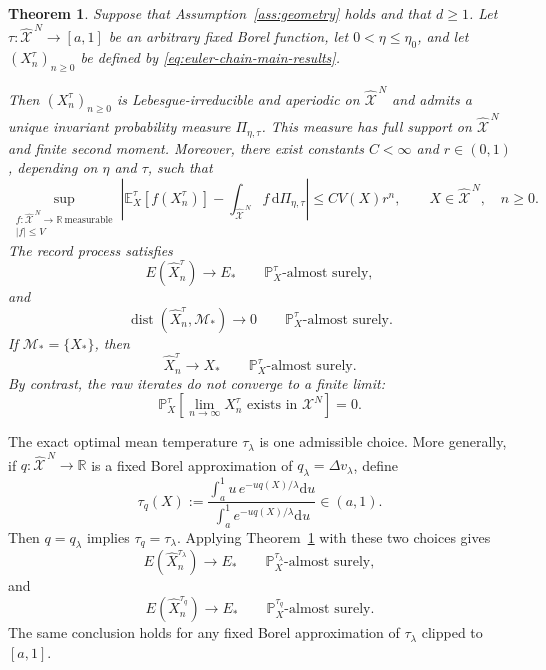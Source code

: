 \documentclass[11pt]{article}
\def\Mc{{\mathcal M}}
\def\Xc{{\mathcal X}}
\def\hX{\widehat{\Xc}^{\,N}}
\newcommand{\dd}{\mathrm{d}}
\newcommand{\dist}{\operatorname{dist}}
\newcommand{\Record}{\widehat X}
\newtheorem{theorem}{Theorem}[section]
\theoremstyle{definition}
\theoremstyle{remark}
\numberwithin{equation}{section}
\begin{document}
\begin{theorem}\label{thm:numerical-convergence}
Suppose that Assumption~\ref{ass:geometry} holds and that $d\ge1$.  Let
$\tau:\hX\to[a,1]$ be an arbitrary fixed Borel function, let $0<\eta\le\eta_0$, and let
$(X_n^\tau)_{n\ge0}$ be defined by \eqref{eq:euler-chain-main-results}.

Then $(X_n^\tau)_{n\ge0}$ is Lebesgue-irreducible and aperiodic on $\hX$ and admits a unique
invariant probability measure $\Pi_{\eta,\tau}$.  This measure has full support on $\hX$ and finite
second moment.  Moreover, there exist constants $C<\infty$ and $r\in(0,1)$, depending on $\eta$ and $\tau$, such that
\begin{equation}\label{eq:V-geometric}
 \sup_{\substack{
 f:\hX\to\mathbb R\ \mathrm{measurable}\\
 |f|\le V
 }}
 \left|
 \mathbb E_X^\tau[f(X_n^\tau)]
 -\int_{\hX}f\,\dd\Pi_{\eta,\tau}
 \right|
 \le C V(X)r^n,
 \qquad X\in\hX,\quad n\ge0.
\end{equation}
The record process satisfies
\begin{equation}\label{eq:record-energy-convergence}
 E(\Record_n^\tau)\longrightarrow E_*
 \qquad \mathbb P_X^\tau\text{-almost surely},
\end{equation}
and
\begin{equation}\label{eq:record-distance-convergence}
 \dist(\Record_n^\tau,\Mc_*)\longrightarrow0
 \qquad \mathbb P_X^\tau\text{-almost surely}.
\end{equation}
If $\Mc_*=\{X_*\}$, then
\[
 \Record_n^\tau\longrightarrow X_*
 \qquad \mathbb P_X^\tau\text{-almost surely}.
\]
By contrast, the raw iterates do not converge to a finite limit:
\begin{equation}\label{eq:raw-not-converge}
 \mathbb P_X^\tau\left[
 \lim_{n\to\infty}X_n^\tau\text{ exists in }\Xc^N
 \right]=0.
\end{equation}
\end{theorem}

The exact optimal mean temperature $\tau_\lambda$ is one admissible choice.  More generally, if
$q:\hX\to\mathbb R$ is a fixed Borel approximation of
$q_\lambda=\Delta v_\lambda$, define
\begin{equation}\label{eq:tau-q-main-results}
 \tau_q(X)
 :=
 \frac{\displaystyle\int_a^1u\,e^{-uq(X)/\lambda}\dd u}
 {\displaystyle\int_a^1e^{-uq(X)/\lambda}\dd u}
 \in(a,1).
\end{equation}
Then $q=q_\lambda$ implies $\tau_q=\tau_\lambda$.  Applying
Theorem~\ref{thm:numerical-convergence} with these two choices gives
\begin{equation}\label{eq:record-exact-feedback-convergence}
 E(\Record_n^{\tau_\lambda})\longrightarrow E_*
 \qquad \mathbb P_X^{\tau_\lambda}\text{-almost surely},
\end{equation}
and
\begin{equation}\label{eq:record-approximate-feedback-convergence}
 E(\Record_n^{\tau_q})\longrightarrow E_*
 \qquad \mathbb P_X^{\tau_q}\text{-almost surely}.
\end{equation}
The same conclusion holds for any fixed Borel approximation of $\tau_\lambda$ clipped to
$[a,1]$.
\end{document}
